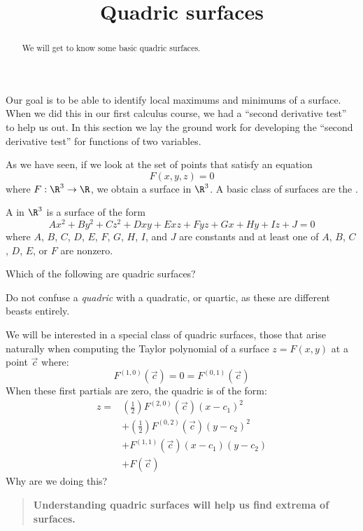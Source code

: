 \documentclass{ximera}
\title[Dig-In:]{Quadric surfaces}
\begin{document}
\begin{abstract}
  We will get to know some basic quadric surfaces.
\end{abstract}
\maketitle

Our goal is to be able to identify local maximums and minimums of a
surface. When we did this in our first calculus course, we had a
``second derivative test'' to help us out. In this section we lay the
ground work for developing the ``second derivative test'' for functions of
two variables.


As we have seen, if we look at the set of points that satisfy an
equation
\[
F(x,y,z)=0
\]
where $F:\R^3\to\R$, we obtain a surface in $\R^3$. A basic class of
surfaces are the .

\begin{definition}
A  in $\R^3$ is a surface of the form
\[
Ax^2 + By^2 + Cz^2 + Dxy + Exz+ Fyz + Gx + Hy + I z + J = 0
\]
where $A$, $B$, $C$, $D$, $E$, $F$, $G$, $H$, $I$, and $J$ are
constants and at least one of $A$, $B$, $C$, $D$, $E$, or $F$ are
nonzero.
\end{definition}

\begin{question}
  Which of the following are quadric surfaces?
  \begin{selectAll}
  \end{selectAll}
\end{question}

\begin{warning}
  Do not confuse a \textit{quadric} with a quadratic, or quartic, as
  these are different beasts entirely.
\end{warning}

We will be interested in a special class of quadric surfaces, those
that arise naturally when computing the Taylor polynomial of a surface
$z=F(x,y)$ at a point $\vec{c}$ where:
\[
F^{(1,0)}(\vec{c}) = 0 = F^{(0,1)}(\vec{c})
\]
When these first partials are zero, the quadric is of the form:
\begin{align*}
  z = &\left(\frac{1}{2}\right)F^{(2,0)}(\vec{c})(x-c_1)^2 \\
  &+ \left(\frac{1}{2}\right)F^{(0,2)}(\vec{c})(y-c_2)^2 \\
  &+ F^{(1,1)}(\vec{c}) (x-c_1)(y-c_2)\\
  &+ F(\vec{c})
\end{align*}
Why are we doing this?
\begin{quote}
  \textbf{Understanding quadric surfaces will help us find extrema of
    surfaces.}
\end{quote}
\end{document}
